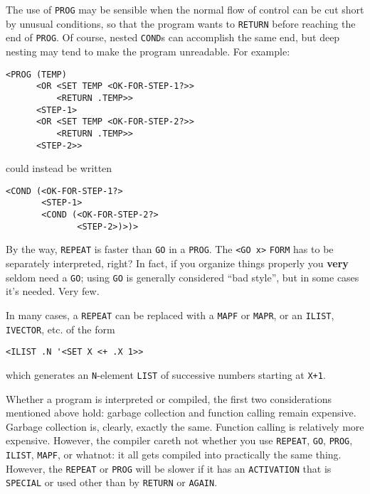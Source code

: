 \documentclass[a4paper,]{article}
\begin{document}
The use of \texttt{PROG} may be sensible when the normal flow of control can be cut short by unusual conditions, so that
the program wants to \texttt{RETURN} before reaching the end of \texttt{PROG}. Of course, nested \texttt{COND}s can
accomplish the same end, but deep nesting may tend to make the program unreadable. For example:

\begin{verbatim}
<PROG (TEMP)
      <OR <SET TEMP <OK-FOR-STEP-1?>>
          <RETURN .TEMP>>
      <STEP-1>
      <OR <SET TEMP <OK-FOR-STEP-2?>>
          <RETURN .TEMP>>
      <STEP-2>>
\end{verbatim}

could instead be written

\begin{verbatim}
<COND (<OK-FOR-STEP-1?>
       <STEP-1>
       <COND (<OK-FOR-STEP-2?>
              <STEP-2>)>)>
\end{verbatim}

By the way, \texttt{REPEAT} is faster than \texttt{GO} in a \texttt{PROG}. The
\texttt{\textless{}GO\ x\textgreater{}} \texttt{FORM} has to be separately interpreted, right? In fact, if you organize
things properly you \textbf{very} seldom need a \texttt{GO}; using \texttt{GO} is generally considered ``bad style'', but
in some cases it's needed. Very few.

In many cases, a \texttt{REPEAT} can be replaced with a \texttt{MAPF} or \texttt{MAPR}, or an
\texttt{ILIST}, \texttt{IVECTOR}, etc. of the form

\begin{verbatim}
<ILIST .N '<SET X <+ .X 1>>
\end{verbatim}

which generates an \texttt{N}-element \texttt{LIST} of successive numbers starting at \texttt{X+1}.

Whether a program is interpreted or compiled, the first two considerations mentioned above hold: garbage collection and
function calling remain expensive. Garbage collection is, clearly, exactly the same. Function calling is relatively more
expensive. However, the compiler careth not whether you use \texttt{REPEAT}, \texttt{GO}, \texttt{PROG}, \texttt{ILIST},
\texttt{MAPF}, or whatnot: it all gets compiled into practically the same thing. However, the \texttt{REPEAT} or
\texttt{PROG} will be slower if it has an \texttt{ACTIVATION}  that is \texttt{SPECIAL} or used
other than by \texttt{RETURN} or \texttt{AGAIN}.
\end{document}
